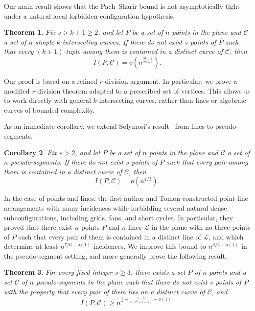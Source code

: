 \documentclass[11pt]{article}
\theoremstyle{plain}
\newtheorem{theorem}{Theorem}[section]
\newtheorem{corollary}[theorem]{Corollary}
\theoremstyle{definition}
\theoremstyle{remark}
\begin{document}
Our main result shows that the Pach--Sharir bound is not asymptotically tight under a natural local forbidden-configuration hypothesis.

\begin{theorem}\label{soly}
Fix \(s>k+1\ge 2\), and let \(P\) be a set of \(n\) points in the plane and \(\mathcal C\) a set of \(n\) simple \(k\)-intersecting curves.
If there do not exist \(s\) points of \(P\) such that every \((k+1)\)-tuple among them is contained in a distinct curve of \(\mathcal C\), then
\[
I(P,\mathcal C)=o\!\left(n^{\frac{3k+1}{2k+1}}\right).
\]
\end{theorem}

\noindent
Our proof is based on a refined $r$-division argument. In particular,
we prove a modified $r$-division theorem adapted to a prescribed set of
vertices. This allows us to work directly with general
$k$-intersecting curves, rather than lines or algebraic curves of
bounded complexity.

As an immediate corollary, we extend Solymosi's result~\cite{SolymosiLocallyDense} from lines to pseudo-segments. 

\begin{corollary}
Fix \(s>2\), and let \(P\) be a set of \(n\) points in the plane and \(\mathcal C\) a set of \(n\) pseudo-segments.
If there do not exist \(s\) points of \(P\) such that every pair among them is contained in a distinct curve of \(\mathcal C\), then
\[
I(P,\mathcal C)=o(n^{4/3}).
\]
\end{corollary}


In the case of points and lines, the first author and Tomon \cite{SuT} constructed point-line arrangements with many incidences while forbidding several natural dense subconfigurations, including grids, fans, and short cycles.  In particular, they proved that there exist \(n\) points \(P\) and \(n\) lines \(\mathcal L\) in the plane with no three points of \(P\) such that every pair of them is contained in a distinct line of \(\mathcal L\), and which determine at least \(n^{7/6-o(1)}\) incidences.  We improve this bound to \(n^{6/5-o(1)}\) in the pseudo-segment setting, and more generally prove the following result.


\begin{theorem}\label{thm:lower}
For every fixed integer \(s\ge 3\), there exists a set \(P\) of \(n\) points and a set \(\mathcal C\) of \(n\) pseudo-segments in the plane such that there do not exist \(s\) points of \(P\) with the property that every pair of them lies on a distinct curve of \(\mathcal C\), and
\[
I(P,\mathcal C)\ge
n^{\frac43-\frac{s-1}{3(s^2-s-1)}-o(1)}.
\]
\end{theorem}
\end{document}
